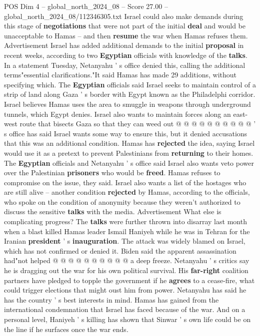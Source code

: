 \begin{textsample}{POS Dim 4 – global\_north\_2024\_08 – Score 27.00 – global\_north\_2024\_08/112346305.txt}
Israel could also make demands during this stage of \textbf{negotiations} that were not part of the initial \textbf{deal} and would be unacceptable to Hamas -- and then \textbf{resume} the war when Hamas refuses them.
Advertisement Israel has added additional demands to the initial \textbf{proposal} in recent weeks, according to two \textbf{Egyptian} officials with knowledge of the \textbf{talks}.
In a statement Tuesday, Netanyahu ' s office denied this, calling the additional terms"essential clarifications."It said Hamas has made 29 additions, without specifying which.
The \textbf{Egyptian} officials said Israel seeks to maintain control of a strip of land along Gaza ' s border with Egypt known as the Philadelphi corridor.
Israel believes Hamas uses the area to smuggle in weapons through underground tunnels, which Egypt denies.
Israel also wants to maintain forces along an east-west route that bisects Gaza so that they can weed out @ @ @ @ @ @ @ @ @ @ ' s office has said Israel wants some way to ensure this, but it denied accusations that this was an additional condition.
Hamas has \textbf{rejected} the idea, saying Israel would use it as a pretext to prevent Palestinians from \textbf{returning} to their homes.
The \textbf{Egyptian} officials and Netanyahu ' s office said Israel also wants veto power over the Palestinian \textbf{prisoners} who would be \textbf{freed}.
Hamas refuses to compromise on the issue, they said.
Israel also wants a list of the hostages who are still alive -- another condition \textbf{rejected} by Hamas, according to the officials, who spoke on the condition of anonymity because they weren't authorized to discuss the sensitive \textbf{talks} with the media.
Advertisement What else is complicating progress?
The \textbf{talks} were further thrown into disarray last month when a blast killed Hamas leader Ismail Haniyeh while he was in Tehran for the Iranian \textbf{president} ' s \textbf{inauguration}.
The attack was widely blamed on Israel, which has not confirmed or denied it.
Biden said the apparent assassination had"not helped @ @ @ @ @ @ @ @ @ @ a deep freeze.
Netanyahu ' s critics say he is dragging out the war for his own political survival.
His \textbf{far-right} coalition partners have pledged to topple the government if he \textbf{agrees} to a cease-fire, what could trigger elections that might oust him from power.
Netanyahu has said he has the country ' s best interests in mind.
Hamas has gained from the international condemnation that Israel has faced because of the war.
And on a personal level, Haniyeh ' s killing has shown that Sinwar ' s own life could be on the line if he surfaces once the war ends.

\end{textsample}
